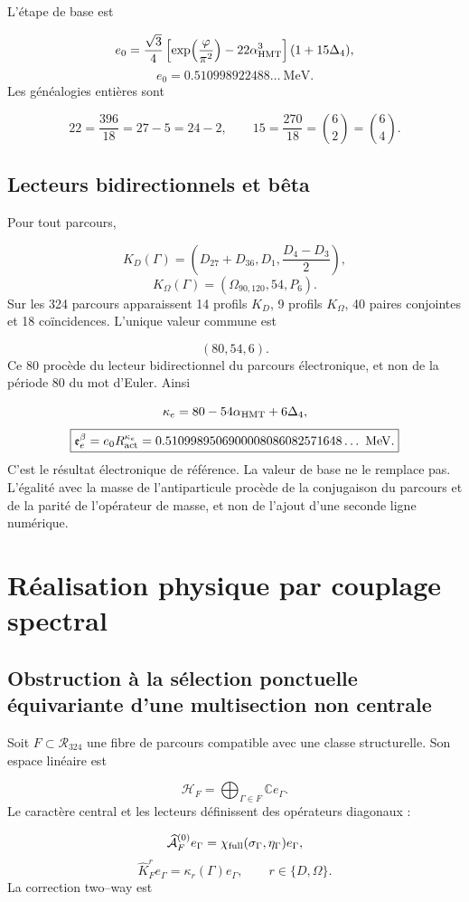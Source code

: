 L'étape de base est

\[
 e_0=\frac{\sqrt3}{4}
 \left[\exp\!\left(\frac{\varphi}{\pi^2}\right)
 -22\alpha_{\rm HMT}^3\right](1+15\Delta_4),
\]
\[
 e_0=0.510998922488\ldots\ \mathrm{MeV}.
\]
Les généalogies entières sont

\[
 22=\frac{396}{18}=27-5=24-2,
 \qquad
 15=\frac{270}{18}=\binom62=\binom64.
\]
\subsection{Lecteurs bidirectionnels et bêta}
Pour tout parcours,

\[
 K_D(\Gamma)=\left(D_{27}+D_{36},D_1,\frac{D_4-D_3}{2}\right),
\]
\[
 K_\Omega(\Gamma)=(\Omega_{90,120},54,P_6).
\]
Sur les 324 parcours apparaissent 14 profils \(K_D\), 9 profils \(K_\Omega\), 40 paires conjointes et 18 coïncidences. L'unique valeur commune est

\[
 (80,54,6).
\]
Ce 80 procède du lecteur bidirectionnel du parcours électronique, et non de la période 80 du mot d'Euler. Ainsi

\[
 \kappa_e=80-54\alpha_{\rm HMT}+6\Delta_4,
\]
\[
 \boxed{
 \mathfrak e_e^\beta=e_0R_{\rm act}^{\kappa_e}
 =0.5109989506900008086082571648\ldots\ \mathrm{MeV}.}
\]
C'est le résultat électronique de référence. La valeur de base ne le remplace pas. L'égalité avec la masse de l'antiparticule procède de la conjugaison du parcours et de la parité de l'opérateur de masse, et non de l'ajout d'une seconde ligne numérique.

\section{Réalisation physique par couplage spectral}
\subsection{Obstruction à la sélection ponctuelle équivariante d'une multisection non centrale}
Soit \(F\subset\mathcal R_{324}\) une fibre de parcours compatible avec une classe structurelle. Son espace linéaire est

\[
 \mathcal H_F=\bigoplus_{\Gamma\in F}\mathbb C e_\Gamma.
\]
Le caractère central et les lecteurs définissent des opérateurs diagonaux :

\[
 \widehat{\mathcal A}_F^{(0)}e_\Gamma
 =\chi_{\rm full}(\sigma_\Gamma,\eta_\Gamma)e_\Gamma,
\]
\[
 \widehat K_F^r e_\Gamma=\kappa_r(\Gamma)e_\Gamma,
 \qquad r\in\{D,\Omega\}.
\]
La correction two--way est

